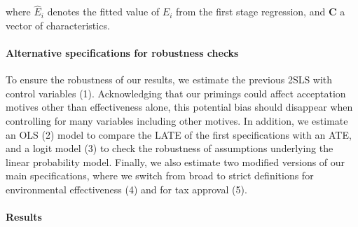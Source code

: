 \documentclass[11pt]{article}
\begin{document}
\noindent
where $\widehat{E}_i$ denotes the fitted value of $E_i$ from the first stage regression, and $\textbf{C}$ a vector of characteristics.

\paragraph{Alternative specifications for robustness checks}

To ensure the robustness of our results, we estimate the previous 2SLS with control variables (1). Acknowledging that our primings could affect acceptation motives other than effectiveness alone, this potential bias should disappear when controlling for many variables including other motives. In addition, we estimate an OLS (2) model to compare the LATE of the first specifications with an ATE, and a logit model (3) to check the robustness of assumptions underlying the linear probability model. Finally, we also estimate two modified versions of our main specifications, where we switch from broad to strict definitions for environmental effectiveness (4) and for tax approval (5).


\paragraph{Results}
\end{document}
